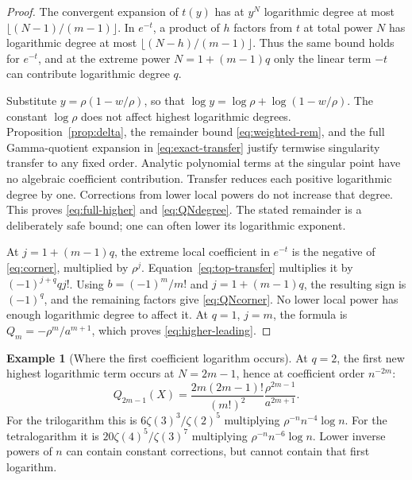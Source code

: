 \documentclass[11pt,a4paper]{article}
\numberwithin{equation}{section}
\theoremstyle{definition}
\newtheorem{example}[theorem]{Example}
\theoremstyle{remark}
\begin{document}
\begin{proof}
The convergent expansion of \(t(y)\) has at \(y^N\) logarithmic degree
at most \(\lfloor(N-1)/(m-1)\rfloor\).
In \(e^{-t}\), a product of \(h\) factors from \(t\) at total power \(N\)
has logarithmic degree at most
\(\lfloor(N-h)/(m-1)\rfloor\).
Thus the same bound holds for \(e^{-t}\), and at the extreme power
\(N=1+(m-1)q\) only the linear term \(-t\) can contribute logarithmic
degree \(q\).

Substitute \(y=\rho(1-w/\rho)\), so that
\(\log y=\log\rho+\log(1-w/\rho)\).
The constant \(\log\rho\) does not affect highest logarithmic degrees.
Proposition~\ref{prop:delta}, the remainder bound
\eqref{eq:weighted-rem}, and the full Gamma-quotient expansion in
\eqref{eq:exact-transfer} justify termwise singularity transfer to
any fixed order.  Analytic polynomial terms at the singular point
have no algebraic coefficient contribution.
Transfer reduces each positive logarithmic degree by one.  Corrections
from lower local powers do not increase that degree.
This proves \eqref{eq:full-higher} and \eqref{eq:QNdegree}.
The stated remainder is a deliberately safe bound; one can often
lower its logarithmic exponent.

At \(j=1+(m-1)q\), the extreme local coefficient in \(e^{-t}\) is
the negative of \eqref{eq:corner}, multiplied by \(\rho^j\).
Equation~\eqref{eq:top-transfer} multiplies it by
\((-1)^{j+q}qj!\).
Using \(b=(-1)^m/m!\) and \(j=1+(m-1)q\), the resulting sign is
\((-1)^q\), and the remaining factors give \eqref{eq:QNcorner}.
No lower local power has enough logarithmic degree to affect it.
At \(q=1\), \(j=m\), the formula is \(Q_m=-\rho^m/a^{m+1}\),
which proves \eqref{eq:higher-leading}.
\end{proof}

\begin{example}[Where the first coefficient logarithm occurs]
At \(q=2\), the first new highest logarithmic term occurs at
\(N=2m-1\), hence at coefficient order \(n^{-2m}\):
\begin{equation}
 [X]Q_{2m-1}(X)=
 \frac{2m(2m-1)!}{(m!)^2}
 \frac{\rho^{2m-1}}{a^{2m+1}}.
 \label{eq:firstcoefflog}
\end{equation}
For the trilogarithm this is
\(6\zeta(3)^3/\zeta(2)^5\) multiplying
\(\rho^{-n}n^{-4}\log n\).
For the tetralogarithm it is
\(20\zeta(4)^5/\zeta(3)^7\) multiplying
\(\rho^{-n}n^{-6}\log n\).
Lower inverse powers of \(n\) can contain constant corrections, but
cannot contain that first logarithm.
\end{example}
\end{document}
